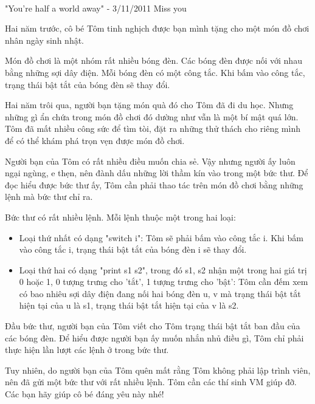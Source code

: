  

"You're half a world away" - 3/11/2011 Miss you

Hai năm trước, cô bé Tôm tinh nghịch được bạn mình tặng cho một món đồ chơi nhân ngày sinh nhật.

Món đồ chơi là một nhóm rất nhiều bóng đèn. Các bóng đèn được nối với nhau bằng những sợi dây điện. Mỗi bóng đèn có một công tắc. Khi bấm vào công tắc, trạng thái bật tắt của bóng đèn sẽ thay đổi.

Hai năm trôi qua, người bạn tặng món quà đó cho Tôm đã đi du học. Nhưng những gì ẩn chứa trong món đồ chơi đó dường như vẫn là một bí mật quá lớn. Tôm đã mất nhiều công sức để tìm tòi, đặt ra những thử thách cho riêng mình để có thể khám phá trọn vẹn được món đồ chơi.

Người bạn của Tôm có rất nhiều điều muốn chia sẻ. Vậy nhưng người ấy luôn ngại ngùng, e thẹn, nên đành dấu những lời thầm kín vào trong một bức thư. Để đọc hiểu được bức thư ấy, Tôm cần phải thao tác trên món đồ chơi bằng những lệnh mà bức thư chỉ ra.

Bức thư có rất nhiều lệnh. Mỗi lệnh thuộc một trong hai loại:
\begin{itemize}
	\item Loại thứ nhất có dạng "switch i": Tôm sẽ phải bấm vào công tắc i. Khi bấm vào công tắc i, trạng thái bật tắt của bóng đèn i sẽ thay đổi.
	\item Loại thứ hai có dạng "print s1 s2", trong đó s1, s2 nhận một trong hai giá trị 0 hoặc 1, 0 tượng trưng cho 'tắt', 1 tượng trưng cho 'bật': Tôm cần đếm xem có bao nhiêu sợi dây điện đang nối hai bóng đèn u, v mà trạng thái bật tắt hiện tại của u là s1, trạng thái bật tắt hiện tại của v là s2.
\end{itemize}

Đầu bức thư, người bạn của Tôm viết cho Tôm trạng thái bật tắt ban đầu của các bóng đèn. Để hiểu được người bạn ấy muốn nhắn nhủ điều gì, Tôm chỉ phải thực hiện lần lượt các lệnh ở trong bức thư.

Tuy nhiên, do người bạn của Tôm quên mất rằng Tôm không phải lập trình viên, nên đã gửi một bức thư với rất nhiều lệnh. Tôm cần các thí sinh VM giúp đỡ. Các bạn hãy giúp cô bé đáng yêu này nhé!